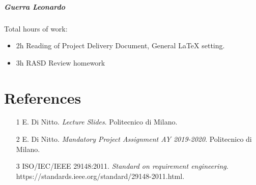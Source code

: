 \documentclass{report}
\newcommand{\ic}[1]{\textit{#1}}
\begin{document}
		\paragraph{Guerra Leonardo} Total hours of work: 
			\begin{itemize}
				\item 2h Reading of Project Delivery Document, General LaTeX setting.
				\item 3h RASD Review homework
				
			\end{itemize}
	\chapter{References}
	\thispagestyle{fancy}
	\begin{itemize}
				\item[1]E. Di Nitto. \ic{Lecture Slides}. Politecnico di Milano.
				\item[2]E. Di Nitto. \ic{Mandatory Project Assignment AY 2019-2020}. Politecnico di Milano.
				\item[3]ISO/IEC/IEEE 29148:2011. \ic{Standard on requirement engineering}.\\https://standards.ieee.org/standard/29148-2011.html.
	\end{itemize}
	
\end{document}
